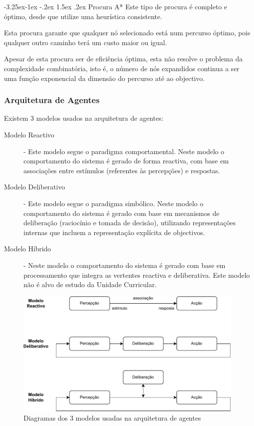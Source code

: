 \documentclass[a4paper,12pt]{article}
\makeatletter
\renewcommand\subparagraph{\@startsection{subparagraph}{5}{\z@}%
                {-3.25ex\@plus -1ex \@minus -.2ex}%
                {1.5ex \@plus .2ex}%
                {\normalfont\normalsize\bfseries}}
\makeatother
\begin{document}
\subparagraph{Procura A*}
Este tipo de procura é completo e óptimo, desde que utilize uma heurística consistente.

Esta procura garante que qualquer nó selecionado está num percurso óptimo, pois qualquer outro caminho terá um custo maior ou igual.

Apesar de esta procura ser de eficiência óptima, esta não resolve o problema da complexidade combinatória, isto é, o número de nós expandidos continua a ser uma função exponencial da dimensão do percurso até ao objectivo.

\subsubsection{Arquitetura de Agentes}
Existem 3 modelos usados na arquitetura de agentes:
\begin{description}
	\item[Modelo Reactivo] - Este modelo segue o paradigma comportamental. Neste modelo o comportamento do sistema é gerado de forma reactiva, com base em associações entre estímulos (referentes às percepções) e respostas.
	\item[Modelo Deliberativo] - Este modelo segue o paradigma simbólico. Neste modelo o comportamento do sistema é gerado com base em mecanismos de deliberação (raciocínio e tomada de decisão), utilizando representações internas que incluem a representação explícita de objectivos.
	\item[Modelo Híbrido] - Neste modelo o comportamento do sistema é gerado com base em processamento que integra as vertentes reactiva e deliberativa. Este modelo não é alvo de estudo da Unidade Curricular.
\end{description}


\begin{figure}[h]
\centering
\includegraphics[scale=0.8]{modelos}
\caption{Diagramas dos 3 modelos usadas na arquitetura de agentes}
\end{figure}
\end{document}
